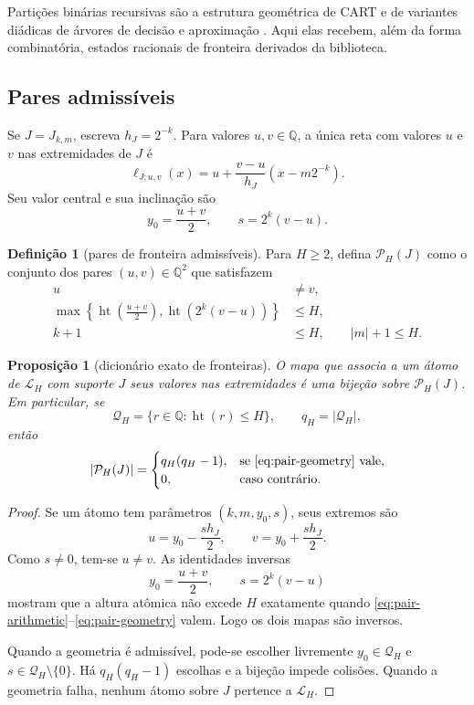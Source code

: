 \documentclass[11pt,a4paper]{article}
\newtheorem{proposition}[theorem]{Proposição}
\theoremstyle{definition}
\newtheorem{definition}[theorem]{Definição}
\theoremstyle{remark}
\newcommand{\Library}{\mathcal{L}}
\newcommand{\Pairs}{\mathcal{P}}
\newcommand{\height}{\operatorname{ht}}
\begin{document}
Partições binárias recursivas são a estrutura geométrica de CART e de variantes
diádicas de árvores de decisão e aproximação
\citep{breiman1984,donoho1997,blanchard2007}. Aqui elas recebem, além da forma
combinatória, estados racionais de fronteira derivados da biblioteca.

\subsection{Pares admissíveis}

Se $J=J_{k,m}$, escreva $h_J=2^{-k}$. Para valores $u,v\in\mathbb Q$, a única
reta com valores $u$ e $v$ nas extremidades de $J$ é
\begin{equation}
 \ell_{J;u,v}(x)
 =u+\frac{v-u}{h_J}(x-m2^{-k}).
 \label{eq:endpoint-line}
\end{equation}
Seu valor central e sua inclinação são
\[
 y_0=\frac{u+v}{2},
 \qquad s=2^k(v-u).
\]

\begin{definition}[pares de fronteira admissíveis]
\label{def:admissible-pairs}
Para $H\ge2$, defina $\Pairs_H(J)$ como o conjunto dos pares
$(u,v)\in\mathbb Q^2$ que satisfazem
\begin{align}
 u&\ne v,\label{eq:pair-nonzero}\\
 \max\!\left\{\height\!\left(\frac{u+v}{2}\right),
 \height\!\left(2^k(v-u)\right)\right\}&\le H,\label{eq:pair-arithmetic}\\
 k+1&\le H,\qquad |m|+1\le H.\label{eq:pair-geometry}
\end{align}
\end{definition}

\begin{proposition}[dicionário exato de fronteiras]
\label{prop:endpoint-dictionary}
O mapa que associa a um átomo de $\Library_H$ com suporte $J$ seus valores
nas extremidades é uma bijeção sobre $\Pairs_H(J)$. Em particular, se
\[
 \mathcal Q_H=\{r\in\mathbb Q:\height(r)\le H\},
 \qquad q_H=|\mathcal Q_H|,
\]
então
\begin{equation}
 |\Pairs_H(J)|=
 \begin{cases}
 q_H(q_H-1),&\text{se \eqref{eq:pair-geometry} vale},\\
 0,&\text{caso contrário}.
 \end{cases}
 \label{eq:pair-count}
\end{equation}
\end{proposition}

\begin{proof}
Se um átomo tem parâmetros $(k,m,y_0,s)$, seus extremos são
\[
 u=y_0-\frac{s h_J}{2},\qquad
 v=y_0+\frac{s h_J}{2}.
\]
Como $s\ne0$, tem-se $u\ne v$. As identidades inversas
\[
 y_0=\frac{u+v}{2},\qquad s=2^k(v-u)
\]
mostram que a altura atômica não excede $H$ exatamente quando
\eqref{eq:pair-arithmetic}--\eqref{eq:pair-geometry} valem. Logo os dois
mapas são inversos.

Quando a geometria é admissível, pode-se escolher livremente
$y_0\in\mathcal Q_H$ e $s\in\mathcal Q_H\setminus\{0\}$. Há
$q_H(q_H-1)$ escolhas e a bijeção impede colisões. Quando a geometria falha,
nenhum átomo sobre $J$ pertence a $\Library_H$.
\end{proof}
\end{document}
